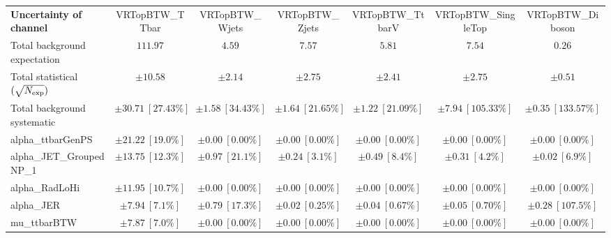 
\begin{sidewaystable}
\begin{center}
\setlength{\tabcolsep}{0.0pc}
\begin{tabular*}{\textwidth}{@{\extracolsep{\fill}}lcccccc}
\noalign{\smallskip}\hline\noalign{\smallskip}
{\bf Uncertainty of channel}                                    & VRTopBTW\_TTbar            & VRTopBTW\_Wjets            & VRTopBTW\_Zjets            & VRTopBTW\_TtbarV            & VRTopBTW\_SingleTop            & VRTopBTW\_Diboson            \\
\noalign{\smallskip}\hline\noalign{\smallskip}
Total background expectation             &  $111.97$        &  $4.59$        &  $7.57$        &  $5.81$        &  $7.54$        &  $0.26$       \\
\noalign{\smallskip}\hline\noalign{\smallskip}
Total statistical $(\sqrt{N_{\rm exp}})$              & $\pm 10.58$        & $\pm 2.14$        & $\pm 2.75$        & $\pm 2.41$        & $\pm 2.75$        & $\pm 0.51$       \\
Total background systematic               & $\pm 30.71\ [27.43\%] $        & $\pm 1.58\ [34.43\%] $        & $\pm 1.64\ [21.65\%] $        & $\pm 1.22\ [21.09\%] $        & $\pm 7.94\ [105.33\%] $        & $\pm 0.35\ [133.57\%] $             \\
\noalign{\smallskip}\hline\noalign{\smallskip}
\noalign{\smallskip}\hline\noalign{\smallskip}
alpha\_ttbarGenPS         & $\pm 21.22\ [19.0\%] $          & $\pm 0.00\ [0.00\%] $          & $\pm 0.00\ [0.00\%] $          & $\pm 0.00\ [0.00\%] $          & $\pm 0.00\ [0.00\%] $          & $\pm 0.00\ [0.00\%] $       \\
alpha\_JET\_GroupedNP\_1         & $\pm 13.75\ [12.3\%] $          & $\pm 0.97\ [21.1\%] $          & $\pm 0.24\ [3.1\%] $          & $\pm 0.49\ [8.4\%] $          & $\pm 0.31\ [4.2\%] $          & $\pm 0.02\ [6.9\%] $       \\
alpha\_RadLoHi         & $\pm 11.95\ [10.7\%] $          & $\pm 0.00\ [0.00\%] $          & $\pm 0.00\ [0.00\%] $          & $\pm 0.00\ [0.00\%] $          & $\pm 0.00\ [0.00\%] $          & $\pm 0.00\ [0.00\%] $       \\
alpha\_JER         & $\pm 7.94\ [7.1\%] $          & $\pm 0.79\ [17.3\%] $          & $\pm 0.02\ [0.25\%] $          & $\pm 0.04\ [0.67\%] $          & $\pm 0.05\ [0.70\%] $          & $\pm 0.28\ [107.5\%] $       \\
mu\_ttbarBTW         & $\pm 7.87\ [7.0\%] $          & $\pm 0.00\ [0.00\%] $          & $\pm 0.00\ [0.00\%] $          & $\pm 0.00\ [0.00\%] $          & $\pm 0.00\ [0.00\%] $          & $\pm 0.00\ [0.00\%] $       \\

\end{tabular*}
\end{center}
\end{sidewaystable}
